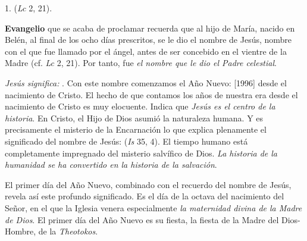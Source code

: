 \begin{body}
	1.  (\emph{Lc} 2, 21).
	
	 \textbf{Evangelio} que se acaba de proclamar recuerda que al hijo de María, nacido en Belén, al final de los ocho días prescritos, se le dio el nombre de Jesús, nombre con el que fue llamado por el ángel, antes de ser concebido en el vientre de la Madre (cf. \emph{Lc} 2, 21). Por tanto, fue \emph{el nombre que le dio el Padre celestial}.
	
	\emph{Jesús significa: }. Con este nombre comenzamos el Año Nuevo: {[}1996{]} desde el nacimiento de Cristo. El hecho de que contamos los años de nuestra era desde el nacimiento de Cristo es muy elocuente. Indica que \emph{Jesús es el centro de la historia}. En Cristo, el Hijo de Dios asumió la naturaleza humana. Y es precisamente el misterio de la Encarnación lo que explica plenamente el significado del nombre de Jesús:  (\emph{Is} 35, 4). El tiempo humano está completamente impregnado del misterio salvífico de Dios. \emph{La historia de la humanidad se ha convertido en la historia de la salvación}.
	
	El primer día del Año Nuevo, combinado con el recuerdo del nombre de Jesús, revela así este profundo significado. Es el día de la octava del nacimiento del Señor, en el que la Iglesia venera especialmente \emph{la maternidad divina de la Madre de Dios}. El primer día del Año Nuevo es su fiesta, la fiesta de la Madre del Dios-Hombre, de la \emph{Theotokos}.
	

\end{body}
